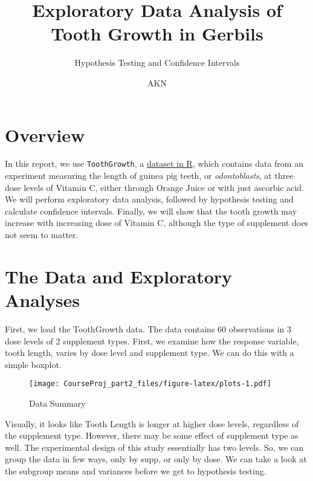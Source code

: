 \documentclass[]{article}
\title{Exploratory Data Analysis of Tooth Growth in Gerbils}
\subtitle{Hypothesis Testing and Confidence Intervals}
\author{AKN}
\date{}
\newenvironment{Shaded}{\begin{snugshade}}{\end{snugshade}}
\newcommand{\KeywordTok}[1]{\textcolor[rgb]{0.13,0.29,0.53}{\textbf{{#1}}}}
\newcommand{\StringTok}[1]{\textcolor[rgb]{0.31,0.60,0.02}{{#1}}}
\newcommand{\NormalTok}[1]{{#1}}
\begin{document}
\maketitle


\section{Overview}\label{overview}

In this report, we use \texttt{ToothGrowth}, a
\href{https://stat.ethz.ch/R-manual/R-devel/library/datasets/html/ToothGrowth.html}{dataset
in R}, which contains data from an experiment measuring the length of
guinea pig teeth, or \emph{odontoblasts}, at three dose levels of
Vitamin C, either through Orange Juice or with just ascorbic acid. We
will perform exploratory data analysis, followed by hypothesis testing
and calculate confidence intervals. Finally, we will show that the tooth
growth may increase with increasing dose of Vitamin C, although the type
of supplement does not seem to matter.

\section{The Data and Exploratory
Analyses}\label{the-data-and-exploratory-analyses}

First, we load the ToothGrowth data. The data contains 60 observations
in 3 dose levels of 2 supplement types. First, we examine how the
response variable, tooth length, varies by dose level and supplement
type. We can do this with a simple boxplot.

\begin{Shaded}
\end{Shaded}

\begin{figure}[htbp]
\centering
\texttt{[image: CourseProj\_part2\_files/figure-latex/plots-1.pdf]}
\caption{Data Summary}
\end{figure}

Visually, it looks like Tooth Length is longer at higher dose levels,
regardless of the supplement type. However, there may be some effect of
supplement type as well. The experimental design of this study
essentially has two levels. So, we can group the data in few ways, only
by supp, or only by dose. We can take a look at the subgroup means and
variances before we get to hypothesis testing.
\end{document}
